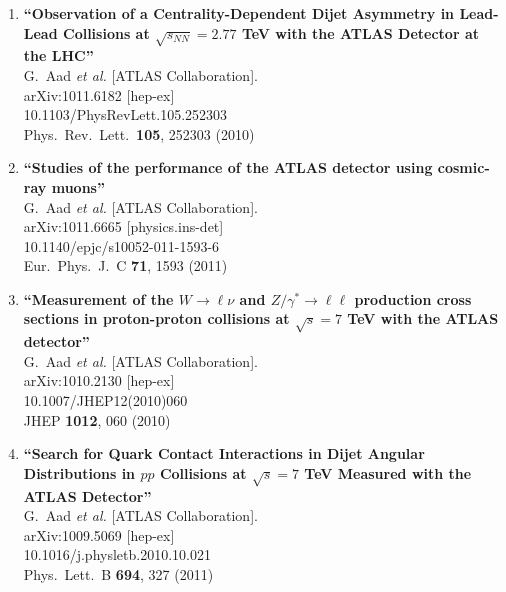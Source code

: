 \documentclass{article}
\begin{document}
\begin{enumerate}
\item%
{\bf ``Observation of a Centrality-Dependent Dijet Asymmetry in Lead-Lead Collisions at $\sqrt{s_{NN}}=2.77$ TeV with the ATLAS Detector at the LHC''}
  \\{}G.~Aad {\it et al.}  [ATLAS Collaboration].
  \\{}arXiv:1011.6182 [hep-ex]
    \\{}10.1103/PhysRevLett.105.252303
\\{}Phys.\ Rev.\ Lett.\  {\bf 105}, 252303 (2010) %


\item%
{\bf ``Studies of the performance of the ATLAS detector using cosmic-ray muons''}
  \\{}G.~Aad {\it et al.}  [ATLAS Collaboration].
  \\{}arXiv:1011.6665 [physics.ins-det]
    \\{}10.1140/epjc/s10052-011-1593-6
\\{}Eur.\ Phys.\ J.\ C {\bf 71}, 1593 (2011) %


\item%
{\bf ``Measurement of the $W \to \ell\nu$ and $Z/\gamma^* \to \ell\ell$ production cross sections in proton-proton collisions at $\sqrt{s} = 7$ TeV with the ATLAS detector''}
  \\{}G.~Aad {\it et al.}  [ATLAS Collaboration].
  \\{}arXiv:1010.2130 [hep-ex]
    \\{}10.1007/JHEP12(2010)060
\\{}JHEP {\bf 1012}, 060 (2010) %


\item%
{\bf ``Search for Quark Contact Interactions in Dijet Angular Distributions in $pp$ Collisions at $\sqrt{s}=7$ TeV Measured with the ATLAS Detector''}
  \\{}G.~Aad {\it et al.}  [ATLAS Collaboration].
  \\{}arXiv:1009.5069 [hep-ex]
    \\{}10.1016/j.physletb.2010.10.021
\\{}Phys.\ Lett.\ B {\bf 694}, 327 (2011) %



\end{enumerate}
\end{document}
